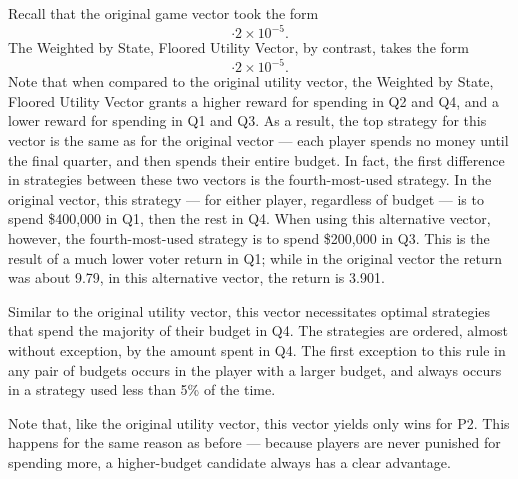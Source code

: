 \documentclass[11pt]{article}
\begin{document}
Recall that the original game vector took the form 
\begin{equation}
[ 0.611974882, 0.214168992, 0.234584564, 2.111203038 ]\cdot 2\times 10^{-5}.
\end{equation}
The Weighted by State, Floored Utility Vector, by contrast, takes the form 
\begin{equation}
[ 0.243860933, 0.282414783, 0.14780057, 3.216185277 ]\cdot 2\times 10^{-5}.
\end{equation}
Note that when compared to the original utility vector, the Weighted by State, Floored Utility Vector grants a higher reward for spending in Q2 and Q4, and a lower reward for spending in Q1 and Q3. As a result, the top strategy for this vector is the same as for the original vector --- each player spends no money until the final quarter, and then spends their entire budget. In fact, the first difference in strategies between these two vectors is the fourth-most-used strategy. In the original vector, this strategy --- for either player, regardless of budget --- is to spend \$400,000 in Q1, then the rest in Q4. When using this alternative vector, however, the fourth-most-used strategy is to spend \$200,000 in Q3. This is the result of a much lower voter return in Q1; while in the original vector the return was about 9.79, in this alternative vector, the return is 3.901.

Similar to the original utility vector, this vector necessitates optimal strategies that spend the majority of their budget in Q4. The strategies are ordered, almost without exception, by the amount spent in Q4. The first exception to this rule in any pair of budgets occurs in the player with a larger budget, and always occurs in a strategy used less than 5\% of the time.

Note that, like the original utility vector, this vector yields only wins for P2. This happens for the same reason as before --- because players are never punished for spending more, a higher-budget candidate always has a clear advantage. 
\end{document}
